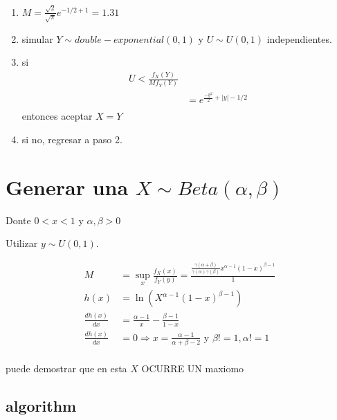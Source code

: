 \documentclass[10pt, oneside]{article}
\begin{document}
\begin{enumerate}
	\item $M = \frac{\sqrt{2}}{\sqrt{\pi}} e^{-1/2 + 1} = 1.31$
	\item simular $Y \sim double-exponential(0,1)$ y $U \sim U(0,1)$ independientes.
	\item si
	      \[
		      \begin{split}
			      U < \frac{f_X(Y)}{M f_Y(Y)}         \\
			      & = e^{\frac{-y^2}{2} + |y| - 1/2} \\
		      \end{split}
	      \]
	      entonces aceptar $X = Y$
	\item si no, regresar a paso 2.
\end{enumerate}


\section{Generar una $X \sim Beta(\alpha,\beta)$}

Donte $0 < x < 1$ y $\alpha, \beta > 0$

Utilizar $y \sim U(0,1)$.

\[
	\begin{split}
		M                 & = \sup_x \frac{f_X(x)}{f_Y(y)} = \frac{\frac{\gamma(\alpha + \beta)}{\gamma(\alpha)\gamma(\beta)}x^{\alpha - 1}(1-x)^{\beta-1}}{1} \\
		h(x)              & = \ln{\left( X^{\alpha - 1}(1-x)^{\beta - 1} \right)}                                                                              \\
		\frac{d h(x)}{dx} & = \frac{\alpha - 1}{x} - \frac{\beta - 1}{1-x}                                                                                     \\
		\frac{d h(x)}{dx} & = 0 \Rightarrow x = \frac{\alpha - 1}{\alpha + \beta - 2}  \text{ y } \beta != 1, \alpha != 1                                      \\
	\end{split}
\]

puede demostrar que en esta $X$ OCURRE UN maxiomo

\subsection{algorithm}
\end{document}
